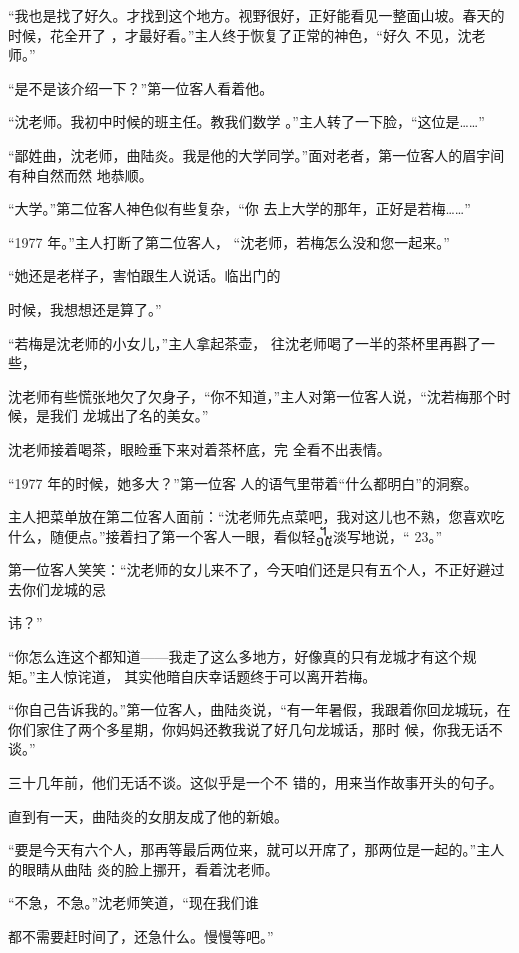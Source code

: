 \documentclass{article}
\begin{document}
“我也是找了好久。才找到这个地方。视野很好，正好能看见一整面山坡。春天的时候，花全开了
\newpage
，才最好看。”主人终于恢复了正常的神色，“好久
不见，沈老师。” 

“是不是该介绍一下？”第一位客人看着他。
 

“沈老师。我初中时候的班主任。教我们数学
。”主人转了一下脸，“这位是……” 

“鄙姓曲，沈老师，曲陆炎。我是他的大学同学。”面对老者，第一位客人的眉宇间有种自然而然
地恭顺。 

“大学。”第二位客人神色似有些复杂，“你
去上大学的那年，正好是若梅……” 

“1977 年。”主人打断了第二位客人，
“沈老师，若梅怎么没和您一起来。” 

“她还是老样子，害怕跟生人说话。临出门的

\newpage
时候，我想想还是算了。” 

“若梅是沈老师的小女儿，”主人拿起茶壶，
往沈老师喝了一半的茶杯里再斟了一些， 

沈老师有些慌张地欠了欠身子，“你不知道，”主人对第一位客人说，“沈若梅那个时候，是我们
龙城出了名的美女。” 

沈老师接着喝茶，眼睑垂下来对着茶杯底，完
全看不出表情。 

“1977 年的时候，她多大？”第一位客
人的语气里带着“什么都明白”的洞察。 

主人把菜单放在第二位客人面前：“沈老师先点菜吧，我对这儿也不熟，您喜欢吃什么，随便点。”接着扫了第一个客人一眼，看似轻᧿淡写地说，“
23。” 

第一位客人笑笑：“沈老师的女儿来不了，今天咱们还是只有五个人，不正好避过去你们龙城的忌
\newpage

讳？” 

“你怎么连这个都知道——我走了这么多地方，好像真的只有龙城才有这个规矩。”主人惊诧道，
其实他暗自庆幸话题终于可以离开若梅。 

“你自己告诉我的。”第一位客人，曲陆炎说，“有一年暑假，我跟着你回龙城玩，在你们家住了两个多星期，你妈妈还教我说了好几句龙城话，那时
候，你我无话不谈。” 

三十几年前，他们无话不谈。这似乎是一个不
错的，用来当作故事开头的句子。 

直到有一天，曲陆炎的女朋友成了他的新娘。

“要是今天有六个人，那再等最后两位来，就可以开席了，那两位是一起的。”主人的眼睛从曲陆
炎的脸上挪开，看着沈老师。 

“不急，不急。”沈老师笑道，“现在我们谁
\newpage

都不需要赶时间了，还急什么。慢慢等吧。” 
\end{document}
